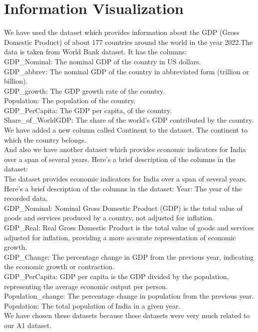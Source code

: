 \documentclass[conference]{IEEEtran}
\begin{document}
\section{Information Visualization}
We have used the dataset which provides information about the GDP (Gross Domestic Product) of about 177 countries around the world in the year 2022.The data is taken from World Bank dataset. It has the columns:\\
GDP\_Nominal: The nominal GDP of the country in US dollars.\\
GDP\_abbrev: The nominal GDP of the country in abbreviated form (trillion or billion).\\
GDP\_growth: The GDP growth rate of the country.\\
Population: The population of the country.\\
GDP\_PerCapita: The GDP per capita, of the country.\\
Share\_of\_WorldGDP: The share of the world's GDP contributed by the country.\\
We have added a new column called Continent to the dataset. The continent to which the country belongs.\\ 
And also we have another dataset which provides economic indicators for India over a span of several years. 
 Here's a brief description of the columns in the dataset:\\
The dataset provides economic indicators for India over a span of several years. Here's a brief description of the columns in the dataset:
Year: The year of the recorded data.\\
GDP\_Nominal: Nominal Gross Domestic Product (GDP) is the total value of goods and services produced by a country, not adjusted for inflation.\\
GDP\_Real: Real Gross Domestic Product is the total value of goods and services adjusted for inflation, providing a more accurate representation of economic growth.\\
GDP\_Change: The percentage change in GDP from the previous year, indicating the economic growth or contraction.\\
GDP\_PerCapita: GDP per capita is the GDP divided by the population, representing the average economic output per person.\\
Population\_change: The percentage change in population from the previous year.\\
Population: The total population of India in a given year.\\
We have chosen these datasets because these datasets were very much related to our A1 dataset.
\end{document}
